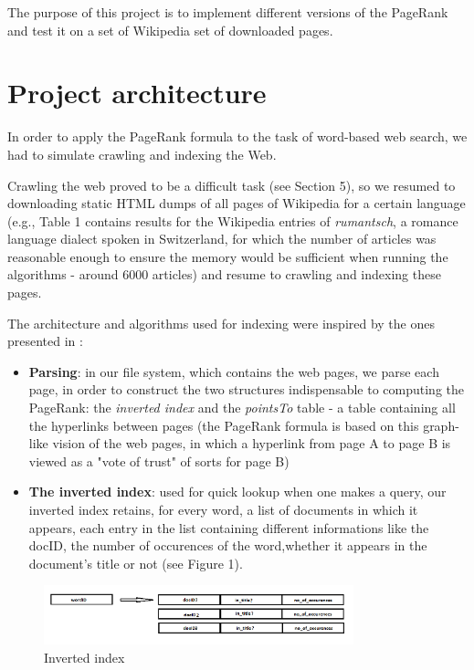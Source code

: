 \documentclass[pdftex,12pt,a4paper]{article}
\begin{document}
The purpose of this project is to implement different versions of the PageRank and test it on a set of Wikipedia set of downloaded pages.


\section{Project architecture}

In order to apply the PageRank formula to the task of word-based web search, we had to simulate crawling and indexing the Web. 

Crawling the web proved to be a difficult task (see Section 5), so we resumed to downloading static HTML dumps of all pages of Wikipedia for a certain language (e.g., Table 1 contains results for the Wikipedia entries of \emph{rumantsch}, a romance language dialect spoken in Switzerland, for which the number of articles was reasonable enough to ensure the memory would be sufficient when running the algorithms - around 6000 articles) and resume to crawling and indexing these pages.
\vspace{10pt}

The architecture and algorithms used for indexing were inspired by the ones presented in \cite{1}:

\begin{itemize}
\item \textbf{Parsing}: in our file system, which contains the web pages, we parse each page, in order to construct the two structures indispensable to computing the PageRank: the \emph{inverted index} and the \emph{pointsTo} table - a table containing all the hyperlinks between pages (the PageRank formula is based on this graph-like vision of the web pages, in which a hyperlink from page A to page B is viewed as a "vote of trust" of sorts for page B)
\item \textbf{The inverted index}: used for quick lookup when one makes a query, our inverted index retains, for every word, a list of documents in which it appears, each entry in the list containing different informations like the docID, the number of occurences of the word,whether it appears in the document's title or not (see Figure 1).

\end{itemize}

\begin{figure}[h]
\includegraphics[width=0.8\textwidth]{index.png}
\caption{Inverted index}
\end{figure}
\end{document}
